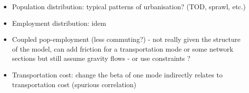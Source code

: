 \documentclass[10pt]{article}
\begin{document}
\begin{itemize}
	\item Population distribution: typical patterns of urbanisation? (TOD, sprawl, etc.)	
	\item Employment distribution: idem
	\item Coupled pop-employment (less commuting?) - not really given the structure of the model, can add friction for a transportation mode or some network sections but still assume gravity flows - or use constraints ?
	\item Transportation cost: change the beta of one mode indirectly relates to transportation cost (spurious correlation)
\end{itemize}















	
\end{document}
